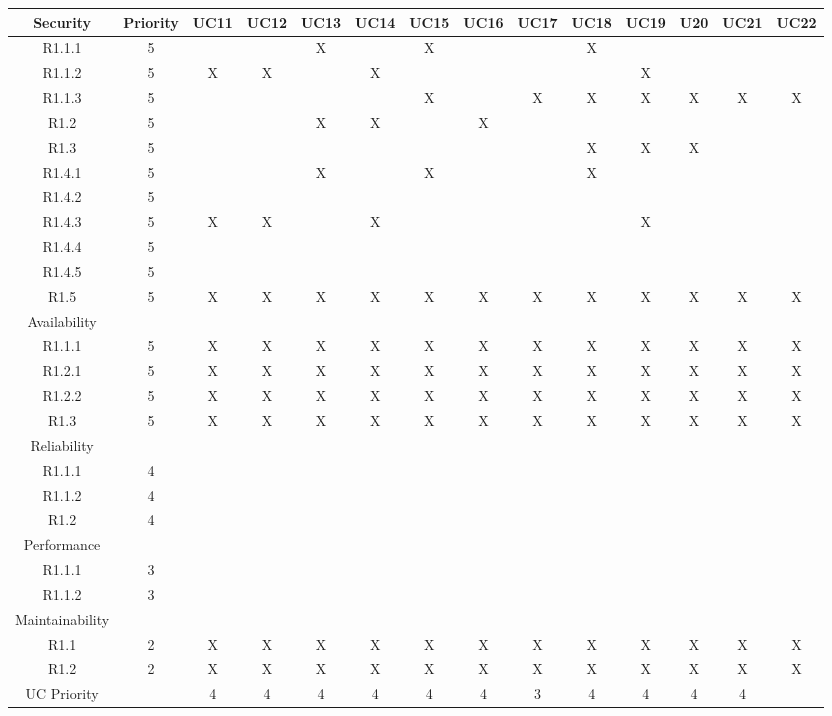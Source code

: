 \documentclass[11pt]{article}
\begin{document}
\begin{center}
	\hspace*{-1.1cm}\begin{tabular}{|c|c|c|c|c|c|c|c|c|c|c|c|c|c|}
	\hline
	Security & Priority & UC11 & UC12 & UC13 & UC14 & UC15 & UC16 & UC17 & UC18 & UC19 & U20 & UC21 & UC22 \\
	\hline
	R1.1.1 & 5 & & & X & & X & & & X & & & & \\
	\hline
	R1.1.2 & 5 & X & X & & X & & & & & X & & & \\
	\hline
	R1.1.3 & 5 & & & & & X & & X & X & X & X & X & X\\
	\hline
	R1.2 & 5 & & & X & X & & X & & & & & &\\
	\hline
	R1.3 & 5 & & & & & & & & X & X & X & &\\
	\hline 
	R1.4.1 & 5 & & & X & & X & & & X & & & &\\
	\hline
	R1.4.2 & 5 & & & & & & & & & & & &\\
	\hline
	R1.4.3 & 5 & X & X & & X & & & & & X & & &\\
	\hline
	R1.4.4 & 5 & & & & & & & & & & & &\\
	\hline
	R1.4.5 & 5 & & & & & & & & & & & &\\
	\hline
	R1.5 & 5 & X & X & X & X & X & X & X & X & X & X & X & X \\
	\hline
	Availability & & & & & & & & & & & & & \\
	\hline
	R1.1.1 & 5 & X & X & X & X & X & X & X & X & X & X & X & X \\
	\hline
	R1.2.1 & 5 & X & X & X & X & X & X & X & X & X & X & X & X \\
	\hline
	R1.2.2 & 5 & X & X & X & X & X & X & X & X & X & X & X & X \\
	\hline 
	R1.3 & 5 & X & X & X & X & X & X & X & X & X & X & X & X \\
	\hline
	Reliability & & & & & & & & & & & & &\\
	\hline
	R1.1.1 & 4 & & & & & & & & & & & &\\
	\hline
	R1.1.2 & 4 & & & & & & & & & & & &\\
	\hline
	R1.2 & 4 & & & & & & & & & & & &\\
	\hline
	Performance & & & & & & & & & & & & &\\
	\hline
	R1.1.1 & 3 & & & & & & & & & & & &\\
	\hline
	R1.1.2 & 3 & & & & & & & & & & & &\\
	\hline
	Maintainability & & & & & & & & & & & & & \\
	\hline
	R1.1 & 2 & X & X & X & X & X & X & X & X & X & X & X & X \\
	\hline
	R1.2 & 2 & X & X & X & X & X & X & X & X & X & X & X & X\\
	\hline
	UC Priority & & 4 & 4 & 4 & 4 & 4 & 4 & 3 & 4 & 4 & 4 & 4 \\
	\hline
	\end{tabular}
\end{center}
\end{document}
